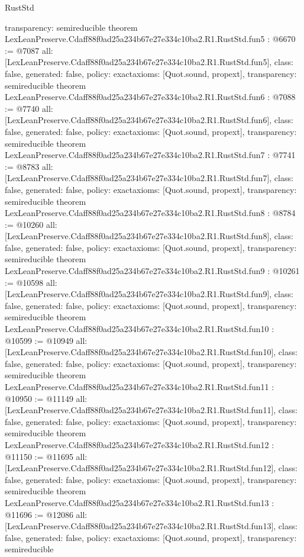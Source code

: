 \begin{lexlean}{RustStd}
\begin{coremodule}
{  transparency: semireducible
}
theorem LexLeanPreserve.Cdaff88f0ad25a234b67e27e334c10ba2.R1.RustStd.fun5 : @6670 := @7087 {
  all: [LexLeanPreserve.Cdaff88f0ad25a234b67e27e334c10ba2.R1.RustStd.fun5],
  class: false,
  generated: false,
  policy: exact{axioms: [Quot.sound, propext]},
  transparency: semireducible
}
theorem LexLeanPreserve.Cdaff88f0ad25a234b67e27e334c10ba2.R1.RustStd.fun6 : @7088 := @7740 {
  all: [LexLeanPreserve.Cdaff88f0ad25a234b67e27e334c10ba2.R1.RustStd.fun6],
  class: false,
  generated: false,
  policy: exact{axioms: [Quot.sound, propext]},
  transparency: semireducible
}
theorem LexLeanPreserve.Cdaff88f0ad25a234b67e27e334c10ba2.R1.RustStd.fun7 : @7741 := @8783 {
  all: [LexLeanPreserve.Cdaff88f0ad25a234b67e27e334c10ba2.R1.RustStd.fun7],
  class: false,
  generated: false,
  policy: exact{axioms: [Quot.sound, propext]},
  transparency: semireducible
}
theorem LexLeanPreserve.Cdaff88f0ad25a234b67e27e334c10ba2.R1.RustStd.fun8 : @8784 := @10260 {
  all: [LexLeanPreserve.Cdaff88f0ad25a234b67e27e334c10ba2.R1.RustStd.fun8],
  class: false,
  generated: false,
  policy: exact{axioms: [Quot.sound, propext]},
  transparency: semireducible
}
theorem LexLeanPreserve.Cdaff88f0ad25a234b67e27e334c10ba2.R1.RustStd.fun9 : @10261 := @10598 {
  all: [LexLeanPreserve.Cdaff88f0ad25a234b67e27e334c10ba2.R1.RustStd.fun9],
  class: false,
  generated: false,
  policy: exact{axioms: [Quot.sound, propext]},
  transparency: semireducible
}
theorem LexLeanPreserve.Cdaff88f0ad25a234b67e27e334c10ba2.R1.RustStd.fun10 : @10599 := @10949 {
  all: [LexLeanPreserve.Cdaff88f0ad25a234b67e27e334c10ba2.R1.RustStd.fun10],
  class: false,
  generated: false,
  policy: exact{axioms: [Quot.sound, propext]},
  transparency: semireducible
}
theorem LexLeanPreserve.Cdaff88f0ad25a234b67e27e334c10ba2.R1.RustStd.fun11 : @10950 := @11149 {
  all: [LexLeanPreserve.Cdaff88f0ad25a234b67e27e334c10ba2.R1.RustStd.fun11],
  class: false,
  generated: false,
  policy: exact{axioms: [Quot.sound, propext]},
  transparency: semireducible
}
theorem LexLeanPreserve.Cdaff88f0ad25a234b67e27e334c10ba2.R1.RustStd.fun12 : @11150 := @11695 {
  all: [LexLeanPreserve.Cdaff88f0ad25a234b67e27e334c10ba2.R1.RustStd.fun12],
  class: false,
  generated: false,
  policy: exact{axioms: [Quot.sound, propext]},
  transparency: semireducible
}
theorem LexLeanPreserve.Cdaff88f0ad25a234b67e27e334c10ba2.R1.RustStd.fun13 : @11696 := @12086 {
  all: [LexLeanPreserve.Cdaff88f0ad25a234b67e27e334c10ba2.R1.RustStd.fun13],
  class: false,
  generated: false,
  policy: exact{axioms: [Quot.sound, propext]},
  transparency: semireducible
}
\end{coremodule}
\end{lexlean}

